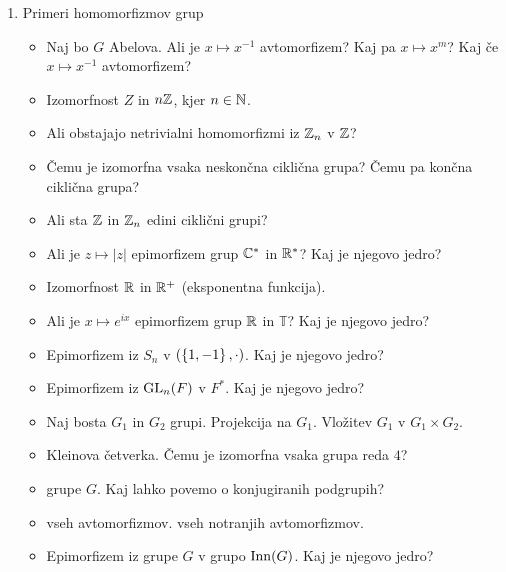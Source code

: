 \begin{enumerate}
    \item Primeri homomorfizmov grup
    \begin{itemize}
        \item Naj bo $G$ Abelova. Ali je $x \mapsto x^{-1}$ avtomorfizem? Kaj pa $x \mapsto x^{m}$? Kaj če $x \mapsto x^{-1}$ avtomorfizem?
        \item Izomorfnost $Z$ in $n\mathbb{Z}$, kjer $n \in \mathbb{N}$.
        \item Ali obstajajo netrivialni homomorfizmi iz $\mathbb{Z}_n$ v $\mathbb{Z}$?
        \item Čemu je izomorfna vsaka neskončna ciklična grupa? Čemu pa končna ciklična grupa?
        \item Ali sta $\mathbb{Z}$ in $\mathbb{Z}_n$ edini ciklični grupi?
        \item Ali je $z \mapsto |z|$ epimorfizem grup $\mathbb{C}^*$ in $\mathbb{R}^*$? Kaj je njegovo jedro?
        \item Izomorfnost $\mathbb{R}$ in $\mathbb{R}^+$ (eksponentna funkcija).
        \item Ali je $x \mapsto e^{ix}$ epimorfizem grup $\mathbb{R}$ in $\mathbb{T}$? Kaj je njegovo jedro?
        \item Epimorfizem iz $S_n$ v $(\left\{1, -1\right\}, \cdot)$. Kaj je njegovo jedro?
        \item Epimorfizem iz $\operatorname{GL}_n(F)$ v $F^*$. Kaj je njegovo jedro?
        \item Naj bosta $G_1$ in $G_2$ grupi. Projekcija na $G_1$. Vložitev $G_1$ v $G_1 \times G_2$.
        \item Kleinova četverka. Čemu je izomorfna vsaka grupa reda $4$?
        \item {} grupe $G$. Kaj lahko povemo o konjugiranih podgrupih?
        \item {} vseh avtomorfizmov.  vseh notranjih avtomorfizmov.
        \item Epimorfizem iz grupe $G$ v grupo $\operatorname{Inn}(G)$. Kaj je njegovo jedro?
    \end{itemize}


\end{enumerate}
